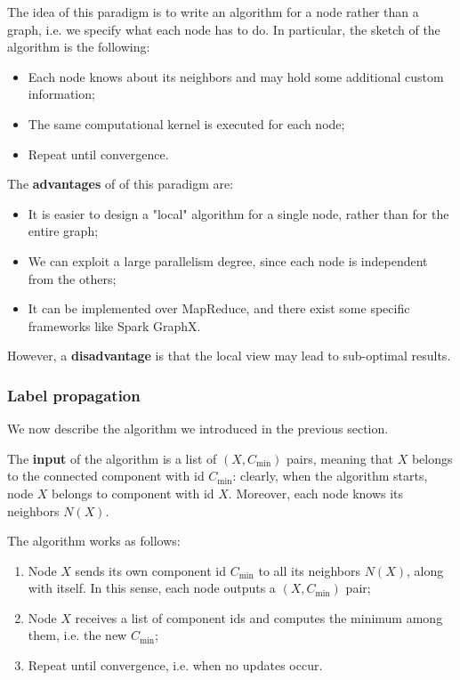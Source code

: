 The idea of this paradigm is to write an algorithm for a node rather than a graph, i.e. we specify what each node has to do. In particular, the sketch of the algorithm is the following:

\begin{itemize}
    \item Each node knows about its neighbors and may hold some additional custom information;
    \item The same computational kernel is executed for each node;
    \item Repeat until convergence.
\end{itemize}

The \textbf{advantages} of of this paradigm are:

\begin{itemize}
    \item It is easier to design a "local" algorithm for a single node, rather than for the entire graph;
    \item We can exploit a large parallelism degree, since each node is independent from the others;
    \item It can be implemented over MapReduce, and there exist some specific frameworks like Spark GraphX.
\end{itemize}

However, a \textbf{disadvantage} is that the local view may lead to sub-optimal results.

\subsubsection{Label propagation}
We now describe the algorithm we introduced in the previous section. 

The \textbf{input} of the algorithm is a list of $(X,C_{\text{min}})$ pairs, meaning that $X$ belongs to the connected component with id $C_{\text{min}}$: clearly, when the algorithm starts, node $X$ belongs to component with id $X$. Moreover, each node knows its neighbors $N(X)$.

The algorithm works as follows:

\begin{enumerate}
    \item Node $X$ sends its own component id $C_{\text{min}}$ to all its neighbors $N(X)$, along with itself. In this sense, each node outputs a $(X, C_{\text{min}})$ pair;
    \item Node $X$ receives a list of component ids and computes the minimum among them, i.e. the new $C_{\text{min}}$;
    \item Repeat until convergence, i.e. when no updates occur.
\end{enumerate}

